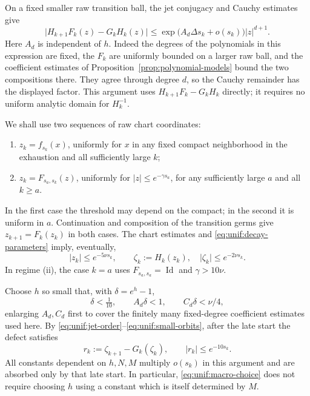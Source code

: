\documentclass[11pt]{article}
\theoremstyle{definition}
\theoremstyle{remark}
\DeclareMathOperator{\Id}{Id}
\newcommand{\abs}[1]{\lvert#1\rvert}
\numberwithin{equation}{section}
\begin{document}
On a fixed smaller raw transition ball, the jet conjugacy and Cauchy
estimates give
\begin{equation}
 \abs{H_{k+1}F_k(z)-G_kH_k(z)}
 \le \exp\bigl(A_d\Delta s_k+o(s_k)\bigr)\abs z^{d+1}.
 \label{eq:unif:remainder}
\end{equation}
Here $A_d$ is independent of $h$.  Indeed the degrees of the
polynomials in this expression are fixed, the $F_k$ are uniformly
bounded on a larger raw ball, and the coefficient estimates of
Proposition~\ref{prop:polynomial-models} bound the two compositions
there.  They agree through degree $d$, so the Cauchy remainder has
the displayed factor.  This argument uses $H_{k+1}F_k-G_kH_k$
directly; it requires no uniform analytic domain for $H_k^{-1}$.

We shall use two sequences of raw chart coordinates:
\begin{enumerate}[label=(\roman*)]
 \item $z_k=f_{s_k}(x)$, uniformly for $x$ in any fixed compact
 neighborhood in the exhaustion and all sufficiently large $k$;
 \item $z_k=F_{s_a,s_k}(z)$, uniformly for
 $\abs z\le e^{-\gamma s_a}$, for any sufficiently large $a$ and
 all $k\ge a$.
\end{enumerate}
In the first case the threshold may depend on the compact; in the
second it is uniform in $a$.  Continuation and composition of the
transition germs give $z_{k+1}=F_k(z_k)$ in both cases.
The chart estimates and \eqref{eq:unif:decay-parameters} imply,
eventually,
\begin{equation}
 \abs{z_k}\le e^{-5\nu s_k},\qquad
 \zeta_k:=H_k(z_k),\quad
 \abs{\zeta_k}\le e^{-2\nu s_k}.
 \label{eq:unif:small-orbits}
\end{equation}
In regime (ii), the case $k=a$ uses $F_{s_a,s_a}=\Id$ and
$\gamma>10\nu$.

Choose $h$ so small that, with $\delta=e^h-1$,
\begin{equation}
 \delta<\tfrac1{10},\qquad
 A_d\delta<1,\qquad C_d\delta<\nu/4,
 \label{eq:unif:macro-choice}
\end{equation}
enlarging $A_d,C_d$ first to cover the finitely many fixed-degree
coefficient estimates used here.  By
\eqref{eq:unif:jet-order}--\eqref{eq:unif:small-orbits}, after the
late start the defect satisfies
\begin{equation}
 r_k:=\zeta_{k+1}-G_k(\zeta_k),\qquad
 \abs{r_k}\le e^{-10s_k}.
 \label{eq:unif:orbit-defect}
\end{equation}
All constants dependent on $h,N,M$ multiply $o(s_k)$ in this argument
and are absorbed only by that late start.  In particular,
\eqref{eq:unif:macro-choice} does not require choosing $h$ using a
constant which is itself determined by $M$.
\end{document}
